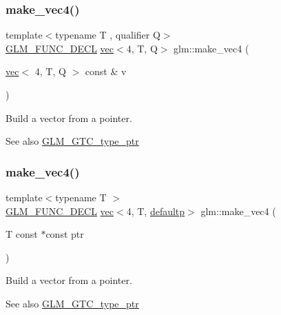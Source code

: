\subsubsection{\texorpdfstring{make\+\_\+vec4()}{make\_vec4()}\hspace{0.1cm}{\footnotesize\ttfamily [4/5]}}
{\footnotesize\ttfamily template$<$typename T , qualifier Q$>$ \\
\mbox{\hyperlink{setup_8hpp_ab2d052de21a70539923e9bcbf6e83a51}{G\+L\+M\+\_\+\+F\+U\+N\+C\+\_\+\+D\+E\+CL}} \mbox{\hyperlink{structglm_1_1vec}{vec}}$<$4, T, Q$>$ glm\+::make\+\_\+vec4 (\begin{DoxyParamCaption}\item[{\mbox{\hyperlink{structglm_1_1vec}{vec}}$<$ 4, T, Q $>$ const \&}]{v }\end{DoxyParamCaption})\hspace{0.3cm}{\ttfamily [inline]}}

Build a vector from a pointer. \begin{DoxySeeAlso}{See also}
\mbox{\hyperlink{group__gtc__type__ptr}{G\+L\+M\+\_\+\+G\+T\+C\+\_\+type\+\_\+ptr}} 
\end{DoxySeeAlso}
\mbox{\label{group__gtc__type__ptr_ga63f576518993efc22a969f18f80e29bb}} 
\subsubsection{\texorpdfstring{make\+\_\+vec4()}{make\_vec4()}\hspace{0.1cm}{\footnotesize\ttfamily [5/5]}}
{\footnotesize\ttfamily template$<$typename T $>$ \\
\mbox{\hyperlink{setup_8hpp_ab2d052de21a70539923e9bcbf6e83a51}{G\+L\+M\+\_\+\+F\+U\+N\+C\+\_\+\+D\+E\+CL}} \mbox{\hyperlink{structglm_1_1vec}{vec}}$<$4, T, \mbox{\hyperlink{namespaceglm_a36ed105b07c7746804d7fdc7cc90ff25a9d21ccd8b5a009ec7eb7677befc3bf51}{defaultp}}$>$ glm\+::make\+\_\+vec4 (\begin{DoxyParamCaption}\item[{T const $\ast$const}]{ptr }\end{DoxyParamCaption})}

Build a vector from a pointer. \begin{DoxySeeAlso}{See also}
\mbox{\hyperlink{group__gtc__type__ptr}{G\+L\+M\+\_\+\+G\+T\+C\+\_\+type\+\_\+ptr}} 
\end{DoxySeeAlso}
\mbox{\label{group__gtc__type__ptr_gaa39964028a0cfbcd18549e33feea7357}} 

